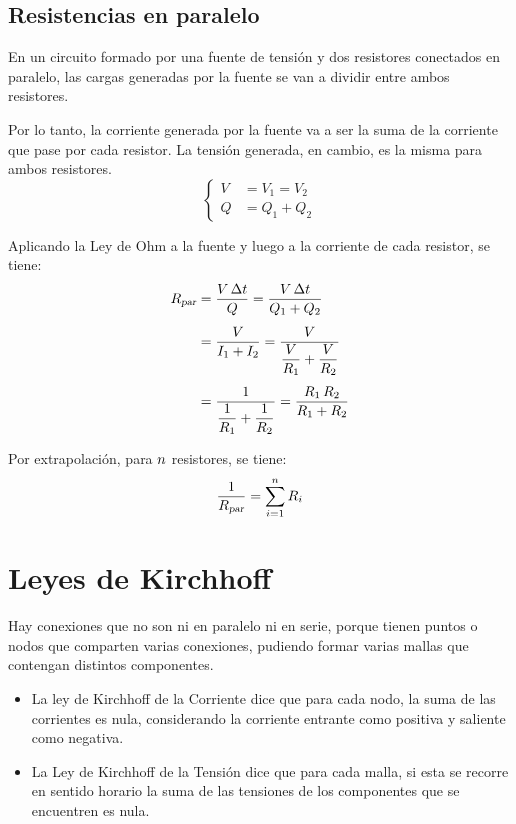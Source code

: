 \documentclass[a5paper,12pt,twoside]{book}
\begin{document}
\subsection*{Resistencias en paralelo}

En un circuito formado por una fuente de tensión y dos resistores conectados en paralelo, las cargas generadas por la fuente se van a dividir entre ambos resistores.

\begin{center}
    \def\svgwidth{0.5\linewidth}
    
\end{center}

Por lo tanto, la corriente generada por la fuente va a ser la suma de la corriente que pase por cada resistor. La tensión generada, en cambio, es la misma para ambos resistores.
\begin{equation*}
    \left\{
    \begin{aligned}
        V &= V_1 = V_2
        \\
        Q &= Q_1 + Q_2
    \end{aligned}
    \right.
\end{equation*}

Aplicando la Ley de Ohm a la fuente y luego a la corriente de cada resistor, se tiene:
\begin{align*}
    {{R}_\textsl{{par}}} &= \frac{V \, \Delta t}{Q} = \frac{V \, \Delta t}{Q_1 + Q_2}
    \\[1ex]
    &= \frac{V}{I_1 + I_2} = \frac{V}{\dfrac{V}{R_1} + \dfrac{V}{R_2}}
    \\[1ex]
    &= \frac{1}{\dfrac{1}{R_1}+\dfrac{1}{R_2}} = \frac{R_1 \, R_2}{R_1 + R_2}
\end{align*}

Por extrapolación, para $n$ resistores, se tiene:
\begin{equation}
    \frac{1}{{{R}_\textsl{{par}}}} = \sum_{i=1}^n R_i
\end{equation}


\section{Leyes de Kirchhoff}

Hay conexiones que no son ni en paralelo ni en serie, porque tienen puntos o nodos que comparten varias conexiones, pudiendo formar varias mallas que contengan distintos componentes.

\begin{itemize}
\item La ley de Kirchhoff de la Corriente dice que para cada nodo, la suma de las corrientes es nula, considerando la corriente entrante como positiva y saliente como negativa.

\item La Ley de Kirchhoff de la Tensión dice que para cada malla, si esta se recorre en sentido horario la suma de las tensiones de los componentes que se encuentren es nula.
\end{itemize}
\end{document}
